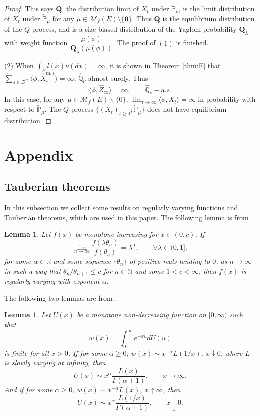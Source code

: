 \documentclass[12pt,a4paper]{amsart}
\numberwithin{equation}{section}
\theoremstyle{plain}
\newtheorem{lem}[thm]{Lemma}
\theoremstyle{definition}
\theoremstyle{remark}
\begin{document}
\begin{proof}
This says $\mathbf Q$, the distribution limit of $X_t$ under $\widetilde{\mathbb P}_{\nu}$, is the  limit distribution of  $X_t$ under $\widetilde{\mathbb P}_{\mu}$ for any $\mu\in{\mathcal M}_f(E)\setminus\{\mathbf 0\}$. Thus $\mathbf Q$ is the
equilibrium distribution of the $Q$-process, and is a size-biased distribution of the Yaglom probability $\mathbf Q_\lambda$ with weight function $\dfrac{\mu(\phi)}{\mathbf Q_\lambda(\mu(\phi))}$.  The proof of $(1)$ is finished.



(2) When $\int_El(x)\nu(dx)=\infty$,
 it is shown in Theorem \ref{thm:E} that
 $\sum_{s\in\mathcal D^{\mathrm m}} \langle \phi,\widehat X^{{\mathrm m},s}_s\rangle =\infty$, $\widehat{\mathbb Q}_\nu$ almost surely. Thus
\[
\langle \phi, \widehat Z_{\infty}\rangle =\infty,\qquad \widehat{\mathbb Q}_\nu-{\mathrm a.s.}
\]
In this case, for any $\mu\in \mathcal M_f(E)\backslash\{0\}$, $\lim_{t\to\infty}\langle \phi, X_t\rangle =\infty$ in probability with respect to $\widetilde{\mathbb P}_\mu$. The  $Q$-process $\{(X_t)_{t\geq 0}; \widetilde{\mathbb P}_{\mu}\}$ does not have equilibrium distribution.
\end{proof}

\section{Appendix}

\subsection{Tauberian theorems}

In this subsection we collect some results on regularly varying functions and  Tauberian theorems, which are used in this paper.
The following lemma is from \cite[Appendix 13.6]{AH}.
\begin{lem}\label{lem:regu}
Let $f(x)$ be monotone increasing for $x\in (0,c)$. If
\[
\lim_{n\to\infty}\dfrac{f(\lambda\theta_n)}{f(\theta_n)}=\lambda^\alpha,\qquad \forall \lambda\in (0,1],
\]
for some $\alpha\in\mathbb R$ and some sequence $\{\theta_n\}$ of positive reals tending to $0$, as $n\to\infty$ in such a way that $\theta_n/\theta_{n+1}\leq c$ for $n\in\mathbb N$ and some $1<c<\infty$, then $f(x)$ is regularly varying with exponent $\alpha$.
\end{lem}


The following two lemmas are from \cite[Appendix 14]{AH}.
\begin{lem}\label{lem: tau}
Let $U(x)$ be a monotone non-decreasing function on $[0,\infty)$ such that
\[
w(x)=\int_0^\infty e^{-xu} dU(u)
\]
is finite for all $x>0$. If for some $\alpha\geq 0$, $w(x)\sim x^{-\alpha}L(1/x)$, $x\downarrow 0$, where $L$ is slowly varying at infinity, then
\[
U(x)\sim x^{\alpha}\dfrac{L(x)}{\Gamma(\alpha+1)},\qquad x\to\infty.
\]
 And if for some $\alpha\geq 0$, $w(x)\sim x^{-\alpha}L(x)$, $x\uparrow \infty$, then
\[
U(x)\sim x^{\alpha}\dfrac{L(1/x)}{\Gamma(\alpha+1)},\qquad x\downarrow 0.
\]
\end{lem}
\end{document}
